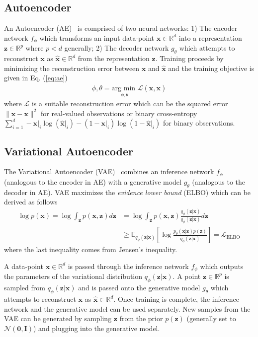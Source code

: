 \documentclass[runningheads]{llncs}
\begin{document}
\subsection{Autoencoder}
An Autoencoder (AE)~\cite{hinton2006reducing} is comprised of two neural networks: 1) The encoder network $f_\phi$ which transforms an input data-point $\mathbf{x} \in \mathbb{R}^d$ into a representation $\mathbf{z} \in \mathbb{R}^p$ where $p < d$ generally; 2) The decoder network $g_\theta$ which attempts to reconstruct $\mathbf{x}$ as $\mathbf{\hat{x}} \in \mathbb{R}^d$ from the representation $\mathbf{z}$. Training proceeds by minimizing the reconstruction error between $\mathbf{x}$ and $\mathbf{\hat{x}}$ and the training objective is given in Eq. (\ref{eq:ae})
\begin{align}
\phi,\theta = \underset{{\phi,\theta}}{\text{arg min }}\mathcal{L}(\mathbf{\hat{x}}, \mathbf{x})
\label{eq:ae}
\end{align}
where $\mathcal{L}$ is a suitable reconstruction error which can be the squared error $\|\mathbf{\hat{x}} - \mathbf{x}\|^2$ for real-valued observations or binary cross-entropy $\sum_{i=1}^d- \mathbf{x}|_i\log (\mathbf{\hat{x}}|_i) - (1 - \mathbf{x}|_i)\log (1 - \mathbf{\hat{x}}|_i)$ for binary observations.

\subsection{Variational Autoencoder}
The Variational Autoencoder (VAE)~\cite{kingma2013auto} combines an inference network $f_\phi$ (analogous to the encoder in AE) with a generative model $g_\theta$ (analogous to the decoder in AE). VAE maximizes the \textit{evidence lower bound} (ELBO) which can be derived as follows
\begin{align}
\log p(\mathbf{x}) = \log\int_{\mathbf{z}}p(\mathbf{x}, \mathbf{z})d\mathbf{z} &= \log\int_{\mathbf{z}}p(\mathbf{x}, \mathbf{z})\frac{q_\phi(\mathbf{z}|\mathbf{x})}{q_\phi(\mathbf{z}|\mathbf{x})}d\mathbf{z}\\
&\geq \mathbb{E}_{q_\phi(\mathbf{z}|\mathbf{x})}\left[\log\frac{p_\theta(\mathbf{x}| \mathbf{z})p(\mathbf{z})}{q_\phi(\mathbf{z}|\mathbf{x})}\right] = \mathcal{L}_{\mathrm{ELBO}}\label{eq:elbo}
\end{align}
where the last inequality comes from Jensen's inequality.

A data-point $\mathbf{x} \in \mathbb{R}^d$ is passed through the inference network $f_\phi$ which outputs the parameters of the variational distribution $q_\phi(\mathbf{z}|\mathbf{x})$. A point $\mathbf{z} \in \mathbb{R}^p$ is sampled from $q_\phi(\mathbf{z}|\mathbf{x})$ and is passed onto the generative model $g_\theta$ which attempts to reconstruct $\mathbf{x}$ as $\mathbf{\hat{x}} \in \mathbb{R}^d$. Once training is complete, the inference network and the generative model can be used separately. New samples from the VAE can be generated by sampling $\mathbf{z}$ from the prior $p(\mathbf{z})$ (generally set to $\mathcal{N}(\bm{0}, \mathbf{I})$) and plugging into the generative model.
\end{document}
